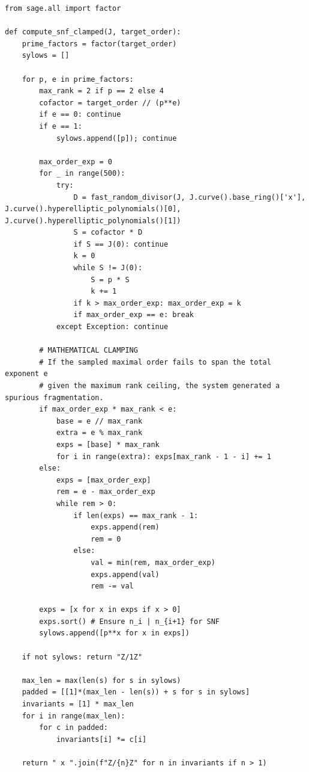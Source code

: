 \documentclass[letterpaper, 11pt]{article}
\begin{document}
\begin{lstlisting}
from sage.all import factor

def compute_snf_clamped(J, target_order):
    prime_factors = factor(target_order)
    sylows = []
    
    for p, e in prime_factors:
        max_rank = 2 if p == 2 else 4
        cofactor = target_order // (p**e)
        if e == 0: continue
        if e == 1: 
            sylows.append([p]); continue
            
        max_order_exp = 0
        for _ in range(500):
            try:
                D = fast_random_divisor(J, J.curve().base_ring()['x'], J.curve().hyperelliptic_polynomials()[0], J.curve().hyperelliptic_polynomials()[1])
                S = cofactor * D
                if S == J(0): continue
                k = 0
                while S != J(0):
                    S = p * S
                    k += 1
                if k > max_order_exp: max_order_exp = k
                if max_order_exp == e: break
            except Exception: continue
                
        # MATHEMATICAL CLAMPING
        # If the sampled maximal order fails to span the total exponent e 
        # given the maximum rank ceiling, the system generated a spurious fragmentation. 
        if max_order_exp * max_rank < e:
            base = e // max_rank
            extra = e % max_rank
            exps = [base] * max_rank
            for i in range(extra): exps[max_rank - 1 - i] += 1
        else:
            exps = [max_order_exp]
            rem = e - max_order_exp
            while rem > 0:
                if len(exps) == max_rank - 1:
                    exps.append(rem)
                    rem = 0
                else:
                    val = min(rem, max_order_exp)
                    exps.append(val)
                    rem -= val
                    
        exps = [x for x in exps if x > 0]
        exps.sort() # Ensure n_i | n_{i+1} for SNF
        sylows.append([p**x for x in exps])
        
    if not sylows: return "Z/1Z"
    
    max_len = max(len(s) for s in sylows)
    padded = [[1]*(max_len - len(s)) + s for s in sylows]
    invariants = [1] * max_len
    for i in range(max_len):
        for c in padded:
            invariants[i] *= c[i]
            
    return " x ".join(f"Z/{n}Z" for n in invariants if n > 1)
\end{lstlisting}
\end{document}

